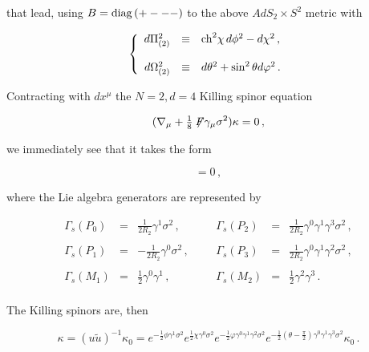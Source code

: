 \documentclass[12pt,a4paper]{article}
\begin{document}
\noindent 
that lead, using $B={\rm diag}\,(+---)$ to the above $AdS_{2}\times
S^{2}$ metric with

\begin{equation}
\left\{
  \begin{array}{rcl}
d\Pi_{(2)}^{2} & \equiv & {\rm ch}^{2}\chi\, d\phi^{2}-d\chi^{2}\, , \\
& & \\
d\Omega_{(2)}^{2} & \equiv & d\theta^{2}+\sin^{2}{\theta}d\varphi^{2}\, .\\
  \end{array}
\right.
\end{equation}

Contracting with $dx^{\mu}$ the $N=2,d=4$ Killing spinor equation

\begin{equation}
(\nabla_{\mu}
+{\textstyle\frac{1}{8}}\not\!\! F\gamma_{\mu}\sigma^{2})\kappa=0\, ,  
\end{equation}

\noindent 
we immediately see that it takes the form 

\begin{equation}
[d +(u \tilde{u})^{-1}d(u\tilde{u})]=0\, ,
\end{equation}

\noindent 
where the Lie algebra generators are represented by 

\begin{equation}
  \begin{array}{rclrcl}
\Gamma_{s}(P_{0}) & = & \frac{1}{2R_{2}}\gamma^{1}\sigma^{2}\, ,
\hspace{1cm} &  
\Gamma_{s}(P_{2}) & = & 
\frac{1}{2R_{2}}\gamma^{0}\gamma^{1}\gamma^{3}\sigma^{2}\, ,\\
& & & & & \\
\Gamma_{s}(P_{1}) & = & -\frac{1}{2R_{2}}\gamma^{0}\sigma^{2}\, ,&
\Gamma_{s}(P_{3}) & = & 
\frac{1}{2R_{2}}\gamma^{0}\gamma^{1}\gamma^{2}\sigma^{2}\, ,\\
& & & & & \\
\Gamma_{s}(M_{1}) & = & \frac{1}{2}\gamma^{0}\gamma^{1}\, ,&
\Gamma_{s}(M_{2}) & = & \frac{1}{2}\gamma^{2}\gamma^{3}\, .\\
  \end{array}
\end{equation}

The Killing spinors are, then

\begin{equation}
\kappa = (u \tilde{u})^{-1}\kappa_{0}=   
e^{-\frac{1}{2}\phi \gamma^{1}\sigma^{2}}
e^{\frac{1}{2}\chi \gamma^{0}\sigma^{2}}
 e^{-\frac{1}{2}\varphi \gamma^{0}\gamma^{1}\gamma^{2}\sigma^{2}} 
e^{-\frac{1}{2}(\theta-\frac{\pi}{2}) 
\gamma^{0}\gamma^{1}\gamma^{3}\sigma^{2}}\kappa_{0}\, .
\end{equation}
\end{document}
